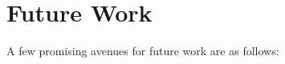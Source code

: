 \begin{comment}

Hopefully, this work will persuade more researchers to put efforts in growing this field of research for electromagnetic applications.

This chapter aimed to investigate the applicability of DRL algorithms in the context of TO. Therefore, it is important to explore the different aspects of RL and choose the most suitable DRL methodology. Further, it is also aimed to persuade researchers to put more effort into RL research in the field of TO. Finally, it is hopeful 

  once  the  training  process  is  finished,  the  deep  learning-based RL  method  is  capable  of  yielding  feasible  solutions  without  any  time-consuming  iterative analysis  process.
  
  A significant contribution of this thesis is to advance the usage of high fidelity solution of at anb early stage of the V design cycle, discussed in Chapter \ref{chapter:1_Intro}

Finally, this chapter aimed to investigate the applicability of DRL algorithms in the context of TO. Therefore, it is important to explore the different aspects of RL and choose the most suitable DRL methodology. Further, it is also aimed to persuade researchers to put more effort into RL research in the field of TO.

\end{comment}


\section{Future Work}

A few promising avenues for future work are as follows:

